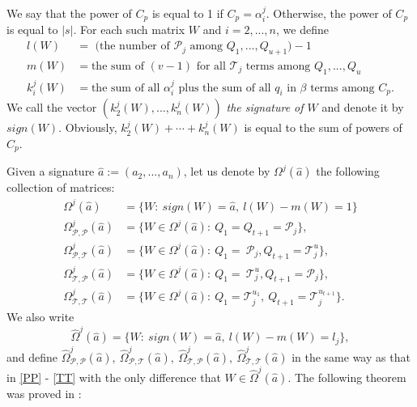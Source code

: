 \documentclass[draft, 12pt, reqno]{amsart}
\numberwithin{equation}{section}
\theoremstyle{plain}
\begin{document}
We say that the power of $C_p$ is equal to 1 if $C_p=\alpha_i^j$. Otherwise, the power of $C_p$ is equal to $|s|$. For each such matrix $W$ and $i=2,..., n$, we define
\begin{align*}	
l(W)&=\text{ (the number of ${\mathcal P}_j$ among $Q_1,...,Q_{u+1}$)} - 1\\
m(W)&=\text{the sum of $(v-1)$ for all ${\mathcal T}_j$ terms among $Q_1,...,Q_u$ }\\
k_i^j(W)&=\text{the sum of all $\alpha_i^j$ plus the sum of all $q_i$ in $\beta$ terms among $C_p$}.
\end{align*}
We call the vector $(k_2^j(W),...,k_n^j(W))$ \textit{the signature of $W$} and denote it by $sign(W)$. Obviously, $k_2^j(W)+\cdots +k_n^j(W)$ is equal to the sum of powers of $C_p$.

Given a signature $\hat{a}:=(a_2,...,a_n)$, let us denote by $\Omega^j(\hat{a})$ the following collection of matrices: 
\begin{align}
\Omega^j(\hat{a})&=\big\{ W : \ sign(W)=\hat{a}, \ l(W)-m(W)=1\big\} \label{Omega self}	\\
\Omega_{{\mathcal P},{\mathcal P}}^j(\hat{a})&= \big \{ W\in \Omega^j(\hat{a}): \ Q_1=Q_{t+1}={\mathcal	 P}_j \big\}, \label{PP}\\
\Omega_{{\mathcal P},{\mathcal T}}^j(\hat{a})&= \big \{ W\in \Omega^j(\hat{a}): \ Q_1= \ {\mathcal	 P}_j, Q_{t+1}={\mathcal T}_j^u \big\} \label{PT},\\
\Omega_{{\mathcal T},{\mathcal P}}^j(\hat{a})&= \big \{ W\in \Omega^j(\hat{a}): \ Q_1= \ {\mathcal	 T}_j^u, Q_{t+1}={\mathcal P}_j \big\}, \label{TP}\\
\Omega_{{\mathcal T},{\mathcal T}}^j(\hat{a})&= \big \{ W\in \Omega^j(\hat{a}): \  Q_{1}={\mathcal T}_j^{u_1}, \ Q_{t+1}=\mathcal{T}_j^{u_{t+1}}\big\}.\label{TT}
\end{align}
We also write
\begin{equation}\label{Omega not self}
\widehat{\Omega}^j(\hat{a})=\big\{ W : \ sign(W)=\hat{a}, \ l(W)-m(W)=l_j\big\},	
\end{equation}
and define $\widehat{\Omega}_{{\mathcal P},{\mathcal P}}^j(\hat{a}),  \ \widehat{\Omega}_{{\mathcal P},{\mathcal T}}^j(\hat{a}),  \ \widehat{\Omega}_{{\mathcal T},{\mathcal P}}^j(\hat{a}), \ 
\widehat{\Omega}_{{\mathcal T},{\mathcal T}}^j(\hat{a})$
in the same way as that in  \eqref{PP} - \eqref{TT} with the only difference that   $W\in \widehat{\Omega}^j(\hat{a})$. The following theorem was proved in \cite{S2}:
\end{document}
